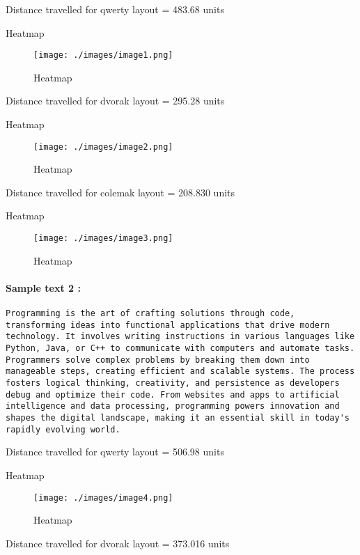 Distance travelled for qwerty layout = 483.68 units

Heatmap

\begin{figure}
\centering
\texttt{[image: ./images/image1.png]}
\caption{Heatmap}
\end{figure}

Distance travelled for dvorak layout = 295.28 units

Heatmap

\begin{figure}
\centering
\texttt{[image: ./images/image2.png]}
\caption{Heatmap}
\end{figure}

Distance travelled for colemak layout = 208.830 units

Heatmap

\begin{figure}
\centering
\texttt{[image: ./images/image3.png]}
\caption{Heatmap}
\end{figure}

\paragraph{Sample text 2 :}\label{sample-text-2}

\begin{verbatim}
Programming is the art of crafting solutions through code, transforming ideas into functional applications that drive modern technology. It involves writing instructions in various languages like Python, Java, or C++ to communicate with computers and automate tasks. Programmers solve complex problems by breaking them down into manageable steps, creating efficient and scalable systems. The process fosters logical thinking, creativity, and persistence as developers debug and optimize their code. From websites and apps to artificial intelligence and data processing, programming powers innovation and shapes the digital landscape, making it an essential skill in today's rapidly evolving world.
\end{verbatim}

Distance travelled for qwerty layout = 506.98 units

Heatmap

\begin{figure}
\centering
\texttt{[image: ./images/image4.png]}
\caption{Heatmap}
\end{figure}

Distance travelled for dvorak layout = 373.016 units

